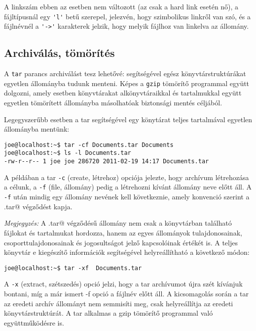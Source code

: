A linkszám ebben az esetben nem változott (az csak a hard link esetén nő), a fájltípusnál egy \verb.'l'. betű szerepel, jelezvén, hogy szimbolikus linkről van szó, és a fájlnévnél a \verb.'->'. karakterek jelzik, hogy melyik fájlhoz van linkelva az állomány.



\subsection{Archiválás, tömörítés}\label{subsec:archiv}
A \verb.tar. parancs archiválást tesz lehetővé: segítségével egész könyvtárstruktúrákat egyetlen állományba tudunk menteni.
Képes a \verb.gzip. tömörítő programmal együtt dolgozni, amely esetben könyvtárakat alkönyvtáraikkal és tartalmukkal együtt egyetlen
tömörített állományba másolhatóak biztonsági mentés céljából.


Legegyszerűbb esetben a tar segítségével egy könytárat teljes tartalmával egyetlen állományba mentünk:
\begin{lstlisting}
joe@localhost:~$ tar -cf Documents.tar Documents
joe@localhost:~$ ls -l Documents.tar 
-rw-r--r-- 1 joe joe 286720 2011-02-19 14:17 Documents.tar
\end{lstlisting}

A példában a tar \verb.-c. (create, létrehoz) opciója jelezte, hogy archívum létrehozása a célunk, a \verb.-f. (file, állomány) pedig a létrehozni kívánt állomány neve előtt áll. A \verb.-f. után mindig egy állomány nevének kell következnie, amely konvenció szerint a \verb@.tar@ végződést kapja.


\textit{Megjegyzés:} A \verb@.tar@ végződésű állomány nem csak a könyvtárban található fájlokat és tartalmukat hordozza, hanem az egyes állományok tulajdonosainak, csoporttulajdonosainak és jogosultságot jelző kapcsolóinak értékét is. A teljes könyvtár e kiegészítő információk segítségével helyreállítható a következő módon:
\begin{lstlisting}
joe@localhost:~$ tar -xf  Documents.tar 
\end{lstlisting}

A \verb.-x. (extract, szétszedés) opció jelzi, hogy a tar archívumot újra szét kívánjuk bontani, míg a már ismert -f opció a fájlnév előtt áll. A kicsomagolás során a tar az eredeti archív állományt nem semmisíti meg, csak helyreállítja az eredeti könyvtárstruktúrát. A tar alkalmas a gzip tömörítő programmal való együttműködésre is.

